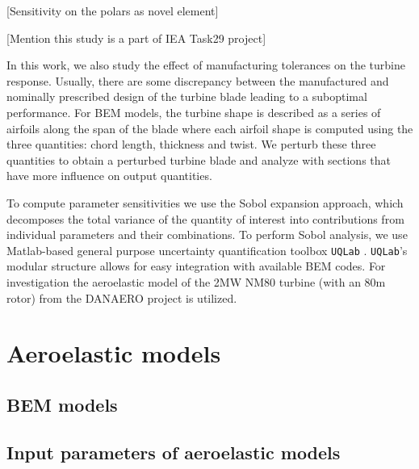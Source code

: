 \documentclass[review]{elsarticle}
\numberwithin{equation}{section}
\numberwithin{equation}{section}
\begin{document}
[Sensitivity on the polars as novel element]

[Mention this study is a part of IEA Task29 project]

In this work, we also study the effect of manufacturing tolerances on the turbine response. Usually, there are some discrepancy between the  manufactured and nominally prescribed design of the turbine blade leading to a suboptimal performance. For BEM models, the turbine shape is described as a series of airfoils along the span of the blade where each airfoil shape is computed using the three quantities: chord length, thickness and twist. We perturb these three quantities to obtain a perturbed turbine blade and analyze with sections that have more influence on output quantities. 

To compute parameter sensitivities we use the Sobol expansion approach, which decomposes the total variance of the quantity of interest into contributions from individual parameters and their combinations. To perform Sobol analysis, we use Matlab-based general purpose uncertainty quantification toolbox \texttt{UQLab} \cite{uqlab}. \texttt{UQLab}'s modular structure allows for easy integration with available BEM codes. For investigation the aeroelastic model of the  2MW NM80 turbine (with an 80m rotor) from the DANAERO project \cite{DANAERO} is utilized.

\section{Aeroelastic models}
\subsection{BEM models}
\subsection{Input parameters of aeroelastic models}
\end{document}
